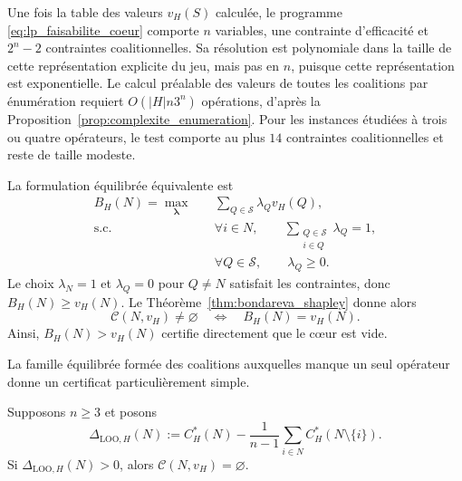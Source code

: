 \begin{remarque}
Une fois la table des valeurs \(v_H(S)\) calculée, le programme
\eqref{eq:lp_faisabilite_coeur} comporte \(n\) variables, une contrainte
d'efficacité et \(2^n-2\) contraintes coalitionnelles. Sa résolution est
polynomiale dans la taille de cette représentation explicite du jeu, mais pas
en \(n\), puisque cette représentation est exponentielle. Le calcul préalable
des valeurs de toutes les coalitions par énumération requiert
\(O(|H|n3^n)\) opérations, d'après la
Proposition~\ref{prop:complexite_enumeration}. Pour les instances étudiées à
trois ou quatre opérateurs, le test comporte au plus \(14\) contraintes
coalitionnelles et reste de taille modeste.
\end{remarque}

La formulation équilibrée équivalente est
\begin{equation}
\label{eq:lp_bondareva_shapley}
\begin{aligned}
B_H(N)
=
\max_{\boldsymbol\lambda}\quad
    & \sum_{Q\in\mathcal S}\lambda_Qv_H(Q),\\
\text{s.c.}\quad
    & \forall i\in N,\qquad
      \sum_{\substack{Q\in\mathcal S\\i\in Q}}\lambda_Q=1,\\
    & \forall Q\in\mathcal S,\qquad
      \lambda_Q\geqslant0.
\end{aligned}
\end{equation}
Le choix \(\lambda_N=1\) et \(\lambda_Q=0\) pour \(Q\neq N\) satisfait
les contraintes, donc \(B_H(N)\geqslant v_H(N)\). Le
Théorème~\ref{thm:bondareva_shapley} donne alors
\[
    \mathcal C(N,v_H)\neq\varnothing
    \quad\Longleftrightarrow\quad
    B_H(N)=v_H(N).
\]
Ainsi, \(B_H(N)>v_H(N)\) certifie directement que le cœur est vide.

La famille équilibrée formée des coalitions auxquelles manque un seul
opérateur donne un certificat particulièrement simple.

\begin{proposition}
\label{prop:certificat_leave_one_out}
Supposons $n\geqslant3$ et posons
\begin{equation}
    \Delta_{\mathrm{LOO},H}(N)
    :=
    C_H^*(N)
    -
    \frac{1}{n-1}
    \sum_{i\in N}C_H^*(N\setminus\{i\}).
    \label{eq:gap_leave_one_out}
\end{equation}
Si \(\Delta_{\mathrm{LOO},H}(N)>0\), alors
\(\mathcal C(N,v_H)=\varnothing\).
\end{proposition}

